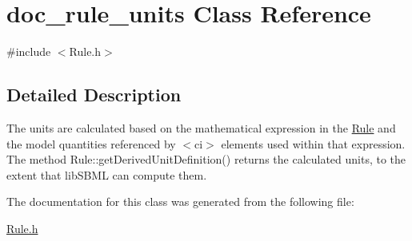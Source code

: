 \hypertarget{classdoc__rule__units}{}\section{doc\+\_\+rule\+\_\+units Class Reference}
\label{classdoc__rule__units}


{\ttfamily \#include $<$Rule.\+h$>$}



\subsection{Detailed Description}
\begin{DoxyParagraph}{}
The units are calculated based on the mathematical expression in the \hyperlink{class_rule}{Rule} and the model quantities referenced by {\ttfamily $<$ci$>$} elements used within that expression. The method Rule\+::get\+Derived\+Unit\+Definition() returns the calculated units, to the extent that lib\+S\+B\+ML can compute them. 
\end{DoxyParagraph}


The documentation for this class was generated from the following file\+:\begin{DoxyCompactItemize}
\item 
\hyperlink{_rule_8h}{Rule.\+h}\end{DoxyCompactItemize}
